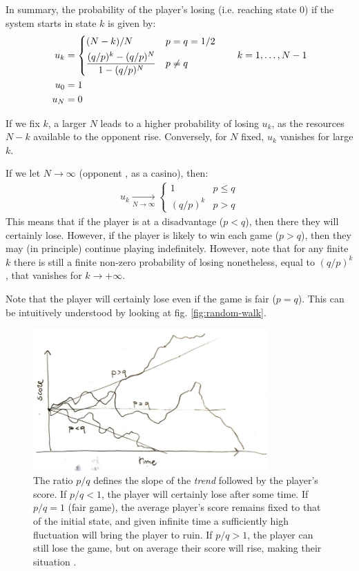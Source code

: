 \documentclass[../template.tex]{subfiles}
\begin{document}
In summary, the probability of the player's losing (i.e. reaching state $0$) if the system starts in state $k$ is given by:
\begin{align*}
    u_k &= \begin{dcases}
        (N-k)/N & p = q = 1/2\\
        \frac{(q/p)^k - (q/p)^N}{1-(q/p)^N} & p \neq q 
    \end{dcases} \qquad  k = 1, \dots, N-1\\
    u_0 &= 1\\
    u_N &= 0
\end{align*}

If we fix $k$, a larger $N$ leads to a higher probability of losing $u_k$, as the resources $N-k$ available to the opponent rise. Conversely, for $N$ fixed, $u_k$ vanishes for large $k$.

\medskip

If we let $N \to \infty$ (opponent , as a casino), then:
\begin{align*}
    u_k  \xrightarrow[N \to \infty]{}  \begin{cases}
        1 & p \leq q\\
        (q/p)^k & p > q
    \end{cases}
\end{align*}
This means that if the player is at a disadvantage ($p < q$), then there they will certainly lose. However, if the player is likely to win each game ($p>q$), then they may (in principle) continue playing indefinitely. However, note that for any finite $k$ there is still a finite non-zero probability of losing nonetheless, equal to $(q/p)^k$, that vanishes for $k \to +\infty$.

Note that the player will certainly lose even if the game is fair ($p=q$). This can be intuitively understood by looking at fig. \ref{fig:random-walk}.

\begin{figure}[htp]
    \centering
    \includegraphics[width=0.8\textwidth]{image005.png}
    \caption{The ratio $p/q$ defines the slope of the \textit{trend} followed by the player's score. If $p/q < 1$, the player will certainly lose after some time. If $p/q=1$ (fair game), the average player's score remains fixed to that of the initial state, and given infinite time a sufficiently high fluctuation will bring the player to ruin. If $p/q > 1$, the player can still lose the game, but on average their score will rise, making their situation .}
\end{figure}
\end{document}
